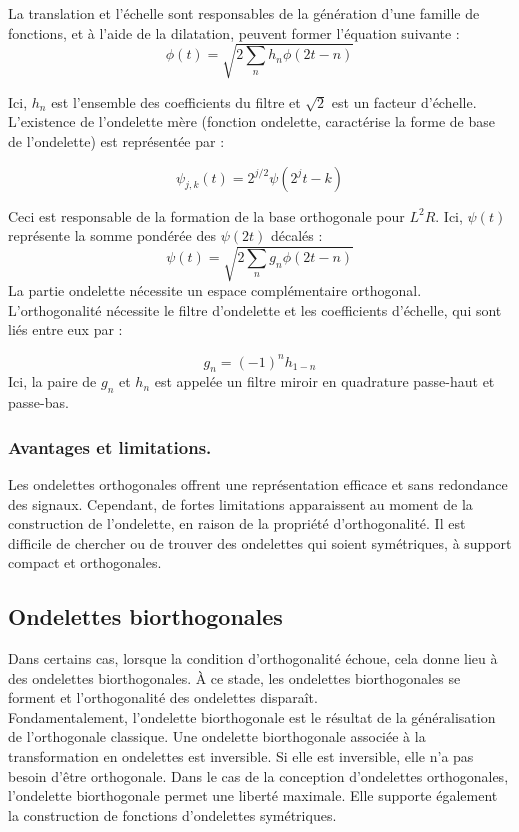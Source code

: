 La translation et l'échelle sont responsables de la génération d'une famille de fonctions, et à l'aide de la dilatation, peuvent former l'équation suivante :
\begin{equation}
    \phi (t) = \sqrt{2\sum_{n}h_{n}\phi (2t - n)} 
\end{equation}

Ici, \(h_n\) est l'ensemble des coefficients du filtre et \(\sqrt{2}\) est un facteur d'échelle. L'existence de l'ondelette mère (fonction ondelette, caractérise la forme de base de l'ondelette) est représentée par :

\begin{equation}
    \psi_{j,k}(t) = 2^{j / 2}\psi (2^{j}t - k) 
\end{equation}


Ceci est responsable de la formation de la base orthogonale pour \(L^2 R\). Ici, \(\psi (t)\) représente la somme pondérée des \(\psi (2t)\) décalés :
\begin{equation}
    \psi (t) = \sqrt{2\sum_{n}g_{n}\phi (2t - n)} 
\end{equation}
La partie ondelette nécessite un espace complémentaire orthogonal. L'orthogonalité nécessite le filtre d'ondelette et les coefficients d'échelle, qui sont liés entre eux par :

\begin{equation}
    g_{n} = (-1)^{n}h_{1 - n} 
\end{equation}
Ici, la paire de \(g_{n}\) et \(h_{n}\) est appelée un filtre miroir en quadrature passe-haut et passe-bas.

\subsubsection*{Avantages et limitations.}
Les ondelettes orthogonales offrent une représentation efficace et sans redondance des signaux. Cependant, de fortes limitations apparaissent au moment de la construction de l'ondelette, en raison de la propriété d'orthogonalité. Il est difficile de chercher ou de trouver des ondelettes qui soient symétriques, à support compact et orthogonales.


\subsection{Ondelettes biorthogonales}
Dans certains cas, lorsque la condition d'orthogonalité échoue, cela donne lieu à des ondelettes biorthogonales. À ce stade, les ondelettes biorthogonales se forment et l'orthogonalité des ondelettes disparaît.\\
Fondamentalement, l'ondelette biorthogonale est le résultat de la généralisation de l'orthogonale classique. Une ondelette biorthogonale associée à la transformation en ondelettes est inversible. Si elle est inversible, elle n'a pas besoin d'être orthogonale. Dans le cas de la conception d'ondelettes orthogonales, l'ondelette biorthogonale permet une liberté maximale. Elle supporte également la construction de fonctions d'ondelettes symétriques.

